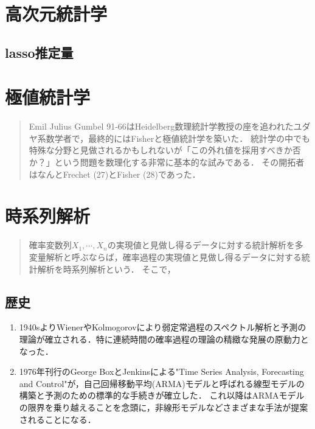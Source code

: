 \documentclass[uplatex,dvipdfmx]{jsreport}
\begin{document}
\chapter{高次元統計学}

\section{lasso推定量}

\begin{definition}
    
\end{definition}

\chapter{極値統計学}

\begin{quotation}
    Emil Julius Gumbel 91-66はHeidelberg数理統計学教授の座を追われたユダヤ系数学者で，最終的にはFisherと極値統計学を築いた．
    統計学の中でも特殊な分野と見做されるかもしれないが「この外れ値を採用すべきか否か？」という問題を数理化する非常に基本的な試みである．
    その開拓者はなんとFrechet (27)とFisher (28)であった．
\end{quotation}

\chapter{時系列解析}

\begin{quotation}
    確率変数列$X_1,\cdots,X_n$の実現値と見做し得るデータに対する統計解析を多変量解析と呼ぶならば，確率過程の実現値と見做し得るデータに対する統計解析を時系列解析という．
    そこで，
\end{quotation}

\section{歴史}

\begin{enumerate}
    \item 1940sよりWienerやKolmogorovにより弱定常過程のスペクトル解析と予測の理論が確立される．特に連続時間の確率過程の理論の精緻な発展の原動力となった．
    \item 1976年刊行のGeorge BoxとJenkinsによる"Time Series Analysis, Forecasting and Control"が，自己回帰移動平均(ARMA)モデルと呼ばれる線型モデルの構築と予測のための標準的な手続きが確立した．
    これ以降はARMAモデルの限界を乗り越えることを念頭に，非線形モデルなどさまざまな手法が提案されることになる．
\end{enumerate}
\end{document}
